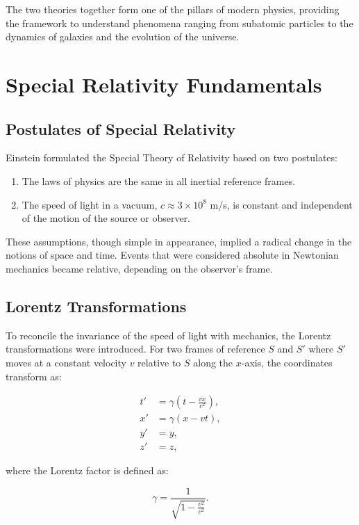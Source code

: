 \documentclass[12pt,a4paper]{article}
\begin{document}
The two theories together form one of the pillars of modern physics,
providing the framework to understand phenomena ranging from subatomic
particles to the dynamics of galaxies and the evolution of the universe.

\section{Special Relativity Fundamentals}

\subsection{Postulates of Special Relativity}
Einstein formulated the Special Theory of Relativity based on two
postulates:
\begin{enumerate}
\item The laws of physics are the same in all inertial reference frames.
\item The speed of light in a vacuum, $c \approx 3 \times 10^{8}$ m/s,
  is constant and independent of the motion of the source or observer.
\end{enumerate}

These assumptions, though simple in appearance, implied a radical change
in the notions of space and time. Events that were considered absolute
in Newtonian mechanics became relative, depending on the observer’s frame.

\subsection{Lorentz Transformations}
To reconcile the invariance of the speed of light with mechanics,
the Lorentz transformations were introduced. For two frames of reference
$S$ and $S'$ where $S'$ moves at a constant velocity $v$ relative to $S$
along the $x$-axis, the coordinates transform as:

\begin{align}
  t' &= \gamma \left( t - \frac{vx}{c^2} \right), \\
  x' &= \gamma (x - vt), \\
  y' &= y, \\
  z' &= z,
\end{align}

where the Lorentz factor is defined as:

\begin{equation}
  \gamma = \frac{1}{\sqrt{1 - \frac{v^2}{c^2}}}.
\end{equation}
\end{document}
